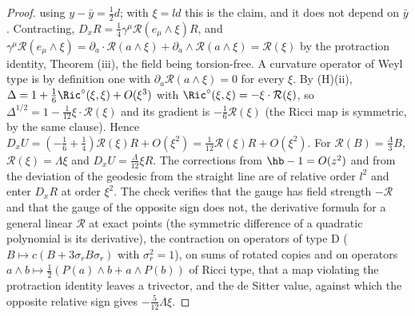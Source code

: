 \begin{proof}
using $y - \bar y = \tfrac12 d$; with $\xi = ld$ this is the claim, and it does not depend on $\bar y$. Contracting, $D_{x}R = \tfrac14\gamma^{\mu}\mathcal{R}(e_{\mu}\wedge\xi)R$, and $\gamma^{\mu}\mathcal{R}(e_{\mu}\wedge\xi) = \partial_{a}\cdot\mathcal{R}(a\wedge\xi) + \partial_{a}\wedge\mathcal{R}(a\wedge\xi) = \mathcal{R}(\xi)$ by the protraction identity, Theorem (iii), the field being torsion-free. A curvature operator of Weyl type is by definition one with $\partial_{a}\mathcal{R}(a\wedge\xi) = 0$ for every $\xi$. By (H)(ii), $\Delta = 1 + \tfrac16\Ric^{\circ}(\xi, \xi) + O(\xi^{3})$ with $\Ric^{\circ}(\xi, \xi) = -\xi\cdot\mathcal{R}(\xi)$, so $\Delta^{1/2} = 1 - \tfrac1{12}\xi\cdot\mathcal{R}(\xi)$ and its gradient is $-\tfrac16\mathcal{R}(\xi)$ (the Ricci map is symmetric, by the same clause). Hence $D_{x}U = (-\tfrac16 + \tfrac14)\mathcal{R}(\xi)R + O(\xi^{2}) = \tfrac1{12}\mathcal{R}(\xi)R + O(\xi^{2})$. For $\mathcal{R}(B) = \tfrac{\Lambda}{3}B$, $\mathcal{R}(\xi) = \Lambda\xi$ and $D_{x}U = \tfrac{\Lambda}{12}\xi R$. The corrections from $\hb - 1 = O(z^{2})$ and from the deviation of the geodesic from the straight line are of relative order $l^{2}$ and enter $D_{x}R$ at order $\xi^{2}$. The check verifies that the gauge has field strength $-\mathcal{R}$ and that the gauge of the opposite sign does not, the derivative formula for a general linear $\mathcal{R}$ at exact points (the symmetric difference of a quadratic polynomial is its derivative), the contraction on operators of type D ($B \mapsto c(B + 3\sigma_{r}B\sigma_{r})$ with $\sigma_{r}^{2} = 1$), on sums of rotated copies and on operators $a\wedge b \mapsto \tfrac12(P(a)\wedge b + a\wedge P(b))$ of Ricci type, that a map violating the protraction identity leaves a trivector, and the de Sitter value, against which the opposite relative sign gives $-\tfrac{5}{12}\Lambda\xi$.


\end{proof}
